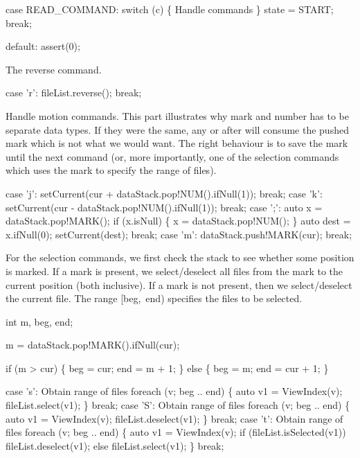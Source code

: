 \nwenddocs{}\endmoddef\nwstartdeflinemarkup\nwenddeflinemarkup
case READ_COMMAND:
  switch (c) \{
    \LA{}Handle commands\RA{}
  \}
  state = START;
  break;

default: assert(0);

\nwendcode{}The reverse command.

\nwenddocs{}\endmoddef\nwstartdeflinemarkup\nwenddeflinemarkup
case 'r':
  fileList.reverse(); break;

\nwendcode{}Handle motion commands. This part illustrates why mark and number
has to be separate data types. If they were the same, any  or
 after  will consume the pushed mark which is not what
we would want. The right behaviour is to save the mark until the next
\unix{;} command (or, more importantly, one of the selection commands
which uses the mark to specify the range of files).

\nwenddocs{}\plusendmoddef\nwstartdeflinemarkup\nwenddeflinemarkup
case 'j':
  setCurrent(cur + dataStack.pop!NUM().ifNull(1));
  break;
case 'k':
  setCurrent(cur - dataStack.pop!NUM().ifNull(1));
  break;
case ';':
  auto x = dataStack.pop!MARK();
  if (x.isNull) \{
    x = dataStack.pop!NUM();
  \}
  auto dest = x.ifNull(0);
  setCurrent(dest);
  break;
case 'm':
  dataStack.push!MARK(cur);
  break;

\nwendcode{}For the selection commands, we first check the stack to see whether
some position is marked. If a mark is present, we select/deselect all
files from the mark to the current position (both inclusive). If a
mark is not present, then we select/deselect the current file. The
range {\Tt{}[beg,\ end)\nwendquote} specifies the files to be selected.

\nwenddocs{}\plusendmoddef\nwstartdeflinemarkup\nwenddeflinemarkup
int m, beg, end;

\nwendcode{}\endmoddef\nwstartdeflinemarkup\nwenddeflinemarkup
m = dataStack.pop!MARK().ifNull(cur);

if (m > cur) \{
  beg = cur;
  end = m + 1;
\} else \{
  beg = m;
  end = cur + 1;
\}

\nwendcode{}\plusendmoddef\nwstartdeflinemarkup\nwenddeflinemarkup
case 's':
  \LA{}Obtain range of files\RA{}
  foreach (v; beg .. end) \{
    auto v1 = ViewIndex(v);
    fileList.select(v1);
  \}
  break;
case 'S':
  \LA{}Obtain range of files\RA{}
  foreach (v; beg .. end) \{
    auto v1 = ViewIndex(v);
    fileList.deselect(v1);
  \}
  break;
case 't':
  \LA{}Obtain range of files\RA{}
  foreach (v; beg .. end) \{
    auto v1 = ViewIndex(v);
    if (fileList.isSelected(v1))
      fileList.deselect(v1);
    else
      fileList.select(v1);
  \}
  break;

